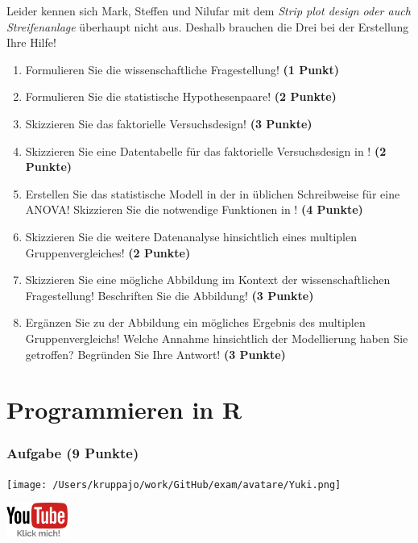 \documentclass[a4paper, 9pt]{scrartcl}\usepackage[]{graphicx}\usepackage[]{xcolor}
\begin{document}
Leider kennen sich Mark, Steffen und Nilufar mit dem \textit{Strip plot design oder auch Streifenanlage} überhaupt nicht aus. Deshalb brauchen die Drei bei der Erstellung Ihre Hilfe!

\begin{enumerate}
  \setcounter{enumi}{0}
  \item Formulieren Sie die wissenschaftliche Fragestellung! \textbf{(1 Punkt)}
  \item Formulieren Sie die statistische Hypothesenpaare! \textbf{(2 Punkte)}
  \item Skizzieren Sie das faktorielle Versuchsdesign! \textbf{(3 Punkte)}
  \item Skizzieren Sie eine Datentabelle für das faktorielle Versuchsdesign in \Rlogo! \textbf{(2 Punkte)}
  \item Erstellen Sie das statistische Modell in der in \Rlogo üblichen Schreibweise für eine ANOVA! Skizzieren Sie die notwendige Funktionen in \Rlogo! \textbf{(4 Punkte)}
  \item Skizzieren Sie die weitere Datenanalyse hinsichtlich eines multiplen Gruppenvergleiches! \textbf{(2 Punkte)}
  \item Skizzieren Sie eine mögliche Abbildung im Kontext der wissenschaftlichen Fragestellung! Beschriften Sie die Abbildung! \textbf{(3 Punkte)}
  \item Ergänzen Sie zu der Abbildung ein mögliches Ergebnis des multiplen Gruppenvergleichs! Welche Annahme hinsichtlich der Modellierung haben Sie getroffen? Begründen Sie Ihre Antwort! \textbf{(3 Punkte)}
\end{enumerate} 
\clearpage
\part{Programmieren in R}

\section{Aufgabe \hfill (9 Punkte)}



 
\begin{minipage}[t]{0.5\textwidth}
\texttt{[image: /Users/kruppajo/work/GitHub/exam/avatare/Yuki.png]}
\end{minipage}
\begin{minipage}[t]{0.5\textwidth}
\hfill
\href{https://www.youtube.com/playlist?list=PLe51bCp9JvEFUnFqaJG5aRmON9i1ZbOYC}{\includegraphics[width = 2cm]{img/youtube}}
\end{minipage}
\vspace{-3ex}
\end{document}
